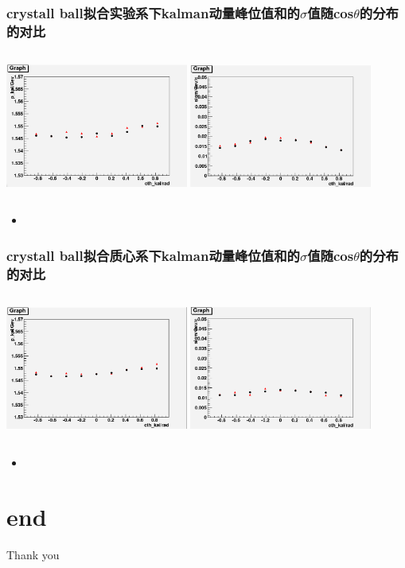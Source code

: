 \documentclass{beamer}
\begin{document}
\begin{frame}
    \frametitle{crystall ball拟合实验系下kalman动量峰位值和的$\sigma$值随cos$\theta$的分布的对比}
    \begin{columns}
        \column{6.0cm}
        \includegraphics[width=6cm, keepaspectratio]{data/pmean_cth.png}
        \column{6.0cm}
        \includegraphics[width=6cm, keepaspectratio]{data/psigm_cth.png}
    \end{columns}
    \begin{itemize}
        \item 
    \end{itemize}

\end{frame}

\begin{frame}
    \frametitle{crystall ball拟合质心系下kalman动量峰位值和的$\sigma$值随cos$\theta$的分布的对比}
    \begin{columns}
        \column{6.0cm}
        \includegraphics[width=6cm, keepaspectratio]{data/pcmsmean_cth.png}
        \column{6.0cm}
        \includegraphics[width=6cm, keepaspectratio]{data/pcmssigm_cth.png}
    \end{columns}
    \begin{itemize}
        \item 
    \end{itemize}

\end{frame}


\section*{end}
\begin{frame}
    \begin{center}
        \Huge Thank you
    \end{center}
\end{frame}
\end{document}
